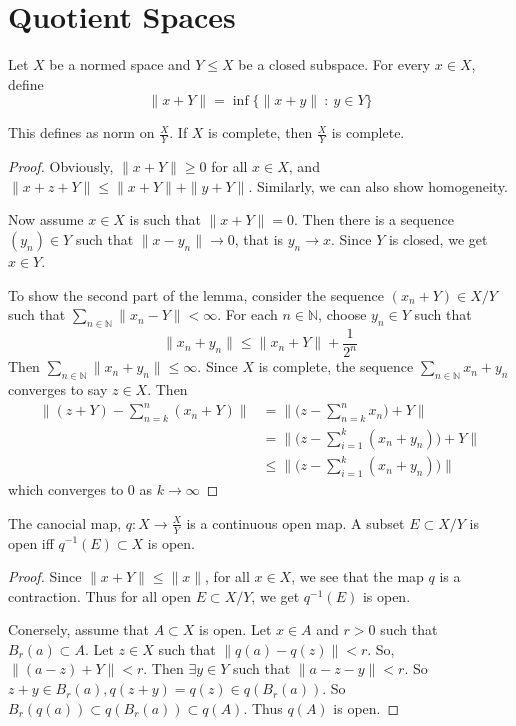 
\section{Quotient Spaces}
\begin{definition}
  Let $X$ be a normed space and $Y \leqslant X$ be a closed
  subspace. For every $x \in X$, define \[
    \|x + Y\| = \inf \{ \|x+y\| \ : \ y \in Y \}
  \]
\end{definition}
\begin{lemma}
  This defines as norm on  $\frac{X}{Y}$. If $X$ is complete, then
  $ \frac{X}{Y}$ is complete.
\end{lemma}
\begin{proof}
  Obviously, $\|x+Y\| \ge 0 $ for all $ x \in X$, and $\|x+z + Y\|
  \le \|x+Y\| + \|y + Y\|$. Similarly, we can also show homogeneity.

  Now assume $x \in X$ is such that $\|x+Y\| = 0$. Then there is a
  sequence $(y_n) \in Y$ such that $ \|x - y_n\| \to 0$, that is
  $y_n \to x$. Since $Y$ is closed, we get $x \in Y$.

  To show the second part of the lemma, consider the sequence $(x_n
  + Y) \in X/Y$ such that $\sum_{n \in \mathbb{N}} \|x_n - Y\| <
  \infty$. For each $ n \in \mathbb{N}$, choose $y_n \in Y$ such that \[
    \|x_n + y_n\| \le \|x_n + Y\| + \frac{1}{2^n}
  \]
  Then $\sum_{n \in \mathbb{N}} \|x_n + y_n\| \le \infty$. Since
  $X$ is complete, the sequence $ \sum_{n \in \mathbb{N}} x_n +
  y_n$ converges to say $z \in X$. Then
  \begin{align*}
    \|(z+Y) - \sum_{n = k}^{n} (x_n +Y)\| &= \|\Big( z - \sum_{n =
    k}^{n} x_n \Big) + Y\| \\
    & = \|\Big( z - \sum_{i = 1}^{k}(x_n + y_n) \Big) + Y\| \\
    & \le \|\Big( z - \sum_{i = 1}^{k}(x_n + y_n) \Big) \|
  \end{align*}
  which converges to 0 as $k \to \infty$
\end{proof}

\begin{lemma}
  The canocial map, $q: X \to \frac{X}{Y}$ is a continuous open
  map. A subset $E \subset X/Y$ is open iff $ q^{-1}(E) \subset X$ is open.
\end{lemma}
\begin{proof}
  Since $\|x + Y\| \le \|x\|$,  for all $x \in X$, we see that the
  map $q$ is a contraction. Thus  for all open $E \subset X/Y$, we
  get $ q^{-1}(E)$ is open.

  Conersely, assume that $  A \subset X$ is open. Let $ x \in A$
  and $ r > 0$ such that $B_r(a) \subset A$. Let $  z \in X$ such
  that $\|q(a) - q(z)\| < r$. So, $\|(a-z) + Y\| < r$. Then
  $\exists y \in Y$ such that $ \|a-z-y\| < r$. So $z+y \in B_r(a),
  q( z+y) = q( z) \in q( B_r(a))$. So $B_r(q(a)) \subset q(
  B_r(a)) \subset q(A)$. Thus $q(A)$ is open.
\end{proof}
